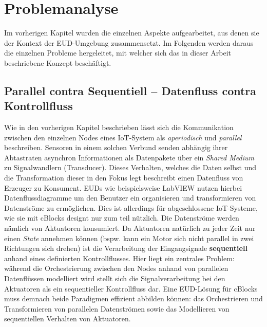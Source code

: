 \section{Problemanalyse}\label{sec:problemanalyse}
Im vorherigen Kapitel wurden die einzelnen Aspekte aufgearbeitet, aus denen sie der Kontext der \ac{EUD}-Umgebung zusammensetzt. Im Folgenden werden daraus die einzelnen Probleme hergeleitet, mit welcher sich das in dieser Arbeit beschriebene Konzept beschäftigt.

\subsection{Parallel contra Sequentiell -- Datenfluss contra Kontrollfluss}
Wie in den vorherigen Kapitel beschrieben lässt sich die Kommunikation zwischen den einzelnen Nodes eines \ac{IoT}-System als \textit{aperiodisch} und \textit{parallel} beschreiben. Sensoren in einem solchen Verbund senden abhängig ihrer Abtastraten asynchron Informationen als Datenpakete über ein \textit{Shared Medium} zu Signalwandlern (Transducer). Dieses Verhalten, welches die Daten selbst und die Transformation dieser in den Fokus legt beschreibt einen Datenfluss von Erzeuger zu Konsument. \acp{EUD} wie beispielsweise LabVIEW nutzen hierbei  Datenflussdiagramme um den Benutzer ein organisieren und transformieren von Datenströme zu ermöglichen. Dies ist allerdings für abgeschlossene \ac{IoT}-Systeme, wie sie mit cBlocks designt nur zum teil nützlich. Die Datenströme werden nämlich von Aktuatoren konsumiert. Da Aktuatoren natürlich zu jeder Zeit nur einen \textit{State} annehmen können (bspw. kann ein Motor sich nicht parallel in zwei Richtungen sich drehen) ist die Verarbeitung der Eingangsignale \textbf{sequentiell} anhand eines definierten Kontrollflusses. Hier liegt ein zentrales Problem: während die Orchestrierung zwischen den Nodes anhand von parallelen Datenflüssen modelliert wird stellt sich die Signalverarbeitung bei den Aktuatoren als ein sequentieller Kontrollfluss dar. Eine \ac{EUD}-Lösung für cBlocks muss demnach beide Paradigmen effizient abbilden können: das Orchestrieren und Transformieren von parallelen Datenströmen sowie das Modellieren von sequentiellen Verhalten von Aktuatoren.

